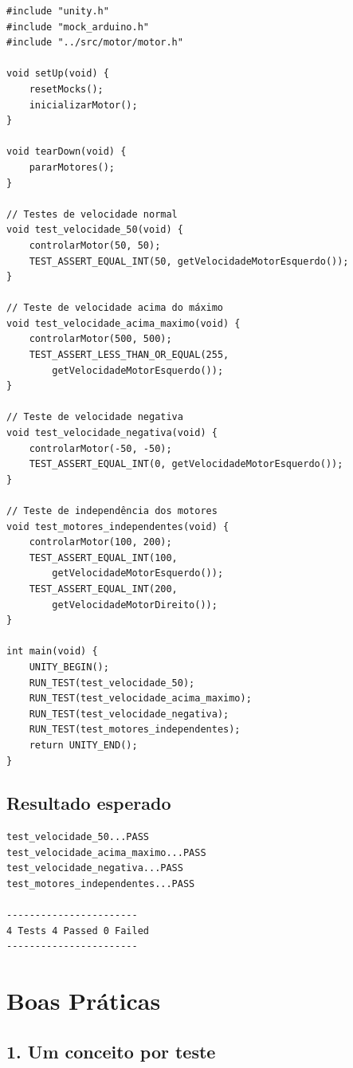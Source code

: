 \documentclass[12pt,a4paper]{article}
\begin{document}
\begin{lstlisting}[caption=test\_motor.c - Suite completa de testes]
#include "unity.h"
#include "mock_arduino.h"
#include "../src/motor/motor.h"

void setUp(void) {
    resetMocks();
    inicializarMotor();
}

void tearDown(void) {
    pararMotores();
}

// Testes de velocidade normal
void test_velocidade_50(void) {
    controlarMotor(50, 50);
    TEST_ASSERT_EQUAL_INT(50, getVelocidadeMotorEsquerdo());
}

// Teste de velocidade acima do máximo
void test_velocidade_acima_maximo(void) {
    controlarMotor(500, 500);
    TEST_ASSERT_LESS_THAN_OR_EQUAL(255, 
        getVelocidadeMotorEsquerdo());
}

// Teste de velocidade negativa
void test_velocidade_negativa(void) {
    controlarMotor(-50, -50);
    TEST_ASSERT_EQUAL_INT(0, getVelocidadeMotorEsquerdo());
}

// Teste de independência dos motores
void test_motores_independentes(void) {
    controlarMotor(100, 200);
    TEST_ASSERT_EQUAL_INT(100, 
        getVelocidadeMotorEsquerdo());
    TEST_ASSERT_EQUAL_INT(200, 
        getVelocidadeMotorDireito());
}

int main(void) {
    UNITY_BEGIN();
    RUN_TEST(test_velocidade_50);
    RUN_TEST(test_velocidade_acima_maximo);
    RUN_TEST(test_velocidade_negativa);
    RUN_TEST(test_motores_independentes);
    return UNITY_END();
}
\end{lstlisting}

\subsection{Resultado esperado}

\begin{lstlisting}[language=bash, caption=Saída dos testes]
test_velocidade_50...PASS
test_velocidade_acima_maximo...PASS
test_velocidade_negativa...PASS
test_motores_independentes...PASS

-----------------------
4 Tests 4 Passed 0 Failed
-----------------------
\end{lstlisting}

\section{Boas Práticas}

\subsection{1. Um conceito por teste}
\end{document}
